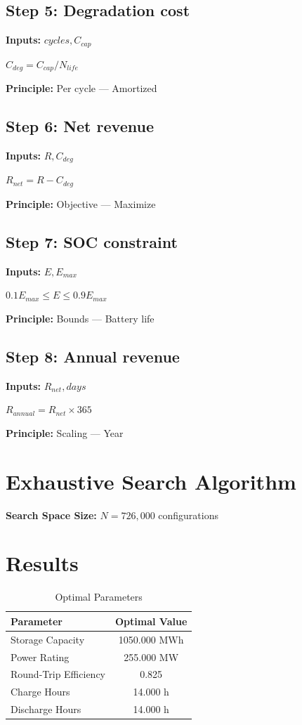 \documentclass[11pt,twocolumn]{article}
\begin{document}
\subsection*{Step 5: Degradation cost}
\textbf{Inputs:} $cycles, C_{cap}$

$C_{deg} = C_{cap}/N_{life}$

\textbf{Principle:} Per cycle --- Amortized

\subsection*{Step 6: Net revenue}
\textbf{Inputs:} $R, C_{deg}$

$R_{net} = R - C_{deg}$

\textbf{Principle:} Objective --- Maximize

\subsection*{Step 7: SOC constraint}
\textbf{Inputs:} $E, E_{max}$

$0.1 E_{max} \leq E \leq 0.9 E_{max}$

\textbf{Principle:} Bounds --- Battery life

\subsection*{Step 8: Annual revenue}
\textbf{Inputs:} $R_{net}, days$

$R_{annual} = R_{net} \times 365$

\textbf{Principle:} Scaling --- Year


\section{Exhaustive Search Algorithm}

\textbf{Search Space Size:} $N = 726,000$ configurations

\section{Results}

\begin{table}[h]
\centering
\caption{Optimal Parameters}
\begin{tabular}{@{}lc@{}}
\toprule
Parameter & Optimal Value \\
\midrule
Storage Capacity & 1050.000 MWh \\
Power Rating & 255.000 MW \\
Round-Trip Efficiency & 0.825  \\
Charge Hours & 14.000 h \\
Discharge Hours & 14.000 h \\
\bottomrule
\end{tabular}
\end{table}
\end{document}
